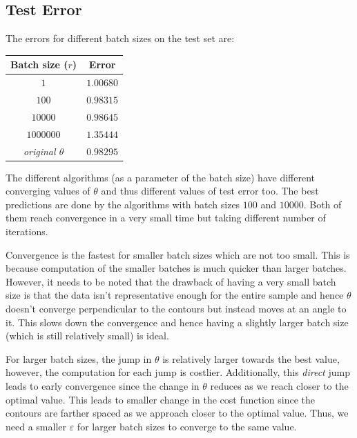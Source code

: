 \documentclass[11pt]{article}
\begin{document}
\subsection{Test Error}\label{2c}
The errors for different batch sizes on the test set are:
\begin{center}
    \begin{tabular}{c c}
        \toprule
        \textbf{Batch size ($r$)} & \textbf{Error}\\
        \midrule
        $1$ & $1.00680$\\
        $100$ & $0.98315$\\
        $10000$ & $0.98645$\\
        $1000000$ & $1.35444$\\
        \midrule
        \textit{original $\theta$} & $0.98295$\\
        \bottomrule
    \end{tabular}
\end{center}
The different algorithms (as a parameter of the batch size) have different converging values of $\theta$ and thus different values of test error too. The best predictions are done by the algorithms with batch sizes $100$ and $10000$. Both of them reach convergence in a very small time but taking different number of iterations.\par
Convergence is the fastest for smaller batch sizes which are not too small. This is because computation of the smaller batches is much quicker than larger batches. However, it needs to be noted that the drawback of having a very small batch size is that the data isn't representative enough for the entire sample and hence $\theta$ doesn't converge perpendicular to the contours but instead moves at an angle to it. This slows down the convergence and hence having a slightly larger batch size
(which is still relatively small) is ideal.\par
For larger batch sizes, the jump in $\theta$ is relatively larger towards the best value, however, the computation for each jump is costlier. Additionally, this \textit{direct} jump leads to early convergence since the change in $\theta$ reduces as we reach closer to the optimal value. This leads to smaller change in the cost function since the contours are farther spaced as we approach closer to the optimal value. Thus, we need a smaller $\varepsilon$ for larger batch sizes to converge to the same value.
\end{document}
